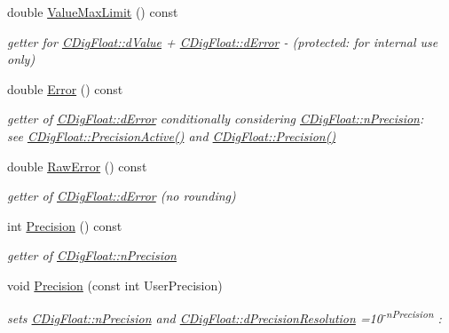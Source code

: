 \begin{DoxyCompactItemize}
double \hyperlink{classCDigFloat_a20195234feac0aaa9acbb5ad0fcfeabb}{Value\+Max\+Limit} () const
\begin{DoxyCompactList}\small\item\em getter for \hyperlink{classCDigFloat_a4bbe69e30dd4e20527362493aa9aaf96}{C\+Dig\+Float\+::d\+Value} + \hyperlink{classCDigFloat_a25eb3782d1e727ff007a48f8308e3d4d}{C\+Dig\+Float\+::d\+Error} -\/ (protected\+: for internal use only) \end{DoxyCompactList}\item 
double \hyperlink{classCDigFloat_aca8ded79bec9c18f5be1cbbbee59f066}{Error} () const
\begin{DoxyCompactList}\small\item\em getter of \hyperlink{classCDigFloat_a25eb3782d1e727ff007a48f8308e3d4d}{C\+Dig\+Float\+::d\+Error} conditionally considering \hyperlink{classCDigFloat_ad580654be35246d14c91482581c0bc11}{C\+Dig\+Float\+::n\+Precision}\+: ~\newline
 see \hyperlink{classCDigFloat_ad1f2365630c9e35e77c01093e73440c4}{C\+Dig\+Float\+::\+Precision\+Active()} and \hyperlink{classCDigFloat_ad66e2fc1bb19f491dfbc4fb7bfb20d47}{C\+Dig\+Float\+::\+Precision()} \end{DoxyCompactList}\item 
double \hyperlink{classCDigFloat_a996749023353bd1df0ab41a2a11e2ee7}{Raw\+Error} () const
\begin{DoxyCompactList}\small\item\em getter of \hyperlink{classCDigFloat_a25eb3782d1e727ff007a48f8308e3d4d}{C\+Dig\+Float\+::d\+Error} (no rounding) \end{DoxyCompactList}\item 
int \hyperlink{classCDigFloat_ad66e2fc1bb19f491dfbc4fb7bfb20d47}{Precision} () const
\begin{DoxyCompactList}\small\item\em getter of \hyperlink{classCDigFloat_ad580654be35246d14c91482581c0bc11}{C\+Dig\+Float\+::n\+Precision} \end{DoxyCompactList}\item 
void \hyperlink{classCDigFloat_a6d12203e256d0fba602b3cfec37f96a6}{Precision} (const int User\+Precision)
\begin{DoxyCompactList}\small\item\em sets \hyperlink{classCDigFloat_ad580654be35246d14c91482581c0bc11}{C\+Dig\+Float\+::n\+Precision} and \hyperlink{classCDigFloat_a7f9809fa0b25da57f5c8c18a02b7d1a7}{C\+Dig\+Float\+::d\+Precision\+Resolution} =10\textsuperscript{-\/n\+Precision} \+: \end{DoxyCompactList}\item 

\end{DoxyCompactItemize}
